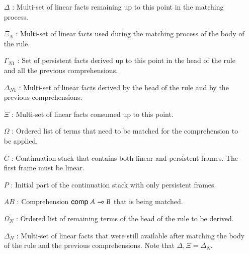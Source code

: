 \begin{enumerate}
   \item[$\Delta$]: Multi-set of linear facts remaining up to this point in the matching process.
   \item[$\Xi_N$]: Multi-set of linear facts used during the matching process of the body of the rule.
   \item[$\Gamma_{N1}$]: Set of persistent facts derived up to this point in the head of the rule and all the previous comprehensions.
   \item[$\Delta_{N1}$]: Multi-set of linear facts derived by the head of the rule and by the previous comprehensions.
   \item[$\Xi$]: Multi-set of linear facts consumed up to this point.
   \item[$\Omega$]: Ordered list of terms that need to be matched for the comprehension to be applied.
   \item[$C$]: Continuation stack that contains both linear and persistent frames. The first frame must be linear.
   \item[$P$]: Initial part of the continuation stack with only persistent frames.
   \item[$AB$]: Comprehension $\mathsf{comp} \; A \multimap B$ that is being matched.
   \item[$\Omega_N$]: Ordered list of remaining terms of the head of the rule to be derived.
   \item[$\Delta_N$]: Multi-set of linear facts that were still available after matching the body of the rule and the previous comprehensions. Note that $\Delta, \Xi = \Delta_N$.
\end{enumerate}

